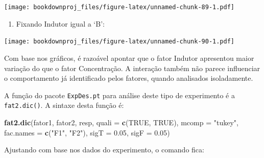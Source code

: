 \documentclass[
]{article}
\newenvironment{Shaded}{\begin{snugshade}}{\end{snugshade}}
\newcommand{\DataTypeTok}[1]{\textcolor[rgb]{0.13,0.29,0.53}{#1}}
\newcommand{\FloatTok}[1]{\textcolor[rgb]{0.00,0.00,0.81}{#1}}
\newcommand{\KeywordTok}[1]{\textcolor[rgb]{0.13,0.29,0.53}{\textbf{#1}}}
\newcommand{\NormalTok}[1]{#1}
\newcommand{\OperatorTok}[1]{\textcolor[rgb]{0.81,0.36,0.00}{\textbf{#1}}}
\newcommand{\OtherTok}[1]{\textcolor[rgb]{0.56,0.35,0.01}{#1}}
\newcommand{\StringTok}[1]{\textcolor[rgb]{0.31,0.60,0.02}{#1}}
\providecommand{\tightlist}{%
  \setlength{\itemsep}{0pt}\setlength{\parskip}{0pt}}
\begin{document}
\texttt{[image: bookdownproj\_files/figure-latex/unnamed-chunk-89-1.pdf]}

\begin{enumerate}
\def\labelenumi{\arabic{enumi}.}
\setcounter{enumi}{6}
\tightlist
\item
  Fixando Indutor igual a `B':
\end{enumerate}

\begin{Shaded}
\end{Shaded}

\texttt{[image: bookdownproj\_files/figure-latex/unnamed-chunk-90-1.pdf]}

Com base nos gráficos, é razoável apontar que o fator Indutor apresentou maior variação do que o fator Concentração. A interação também não parece influenciar o comportamento já identificado pelos fatores, quando analisados isoladamente.

A função do pacote \texttt{ExpDes.pt} para análise deste tipo de experimento é a \texttt{fat2.dic()}. A sintaxe desta função é:

\begin{Shaded}
\begin{Highlighting}[]
\KeywordTok{fat2.dic}\NormalTok{(fator1, fator2, resp, }\DataTypeTok{quali =} \KeywordTok{c}\NormalTok{(}\OtherTok{TRUE}\NormalTok{, }\OtherTok{TRUE}\NormalTok{), }
         \DataTypeTok{mcomp =} \StringTok{"tukey"}\NormalTok{, }\DataTypeTok{fac.names =} \KeywordTok{c}\NormalTok{(}\StringTok{"F1"}\NormalTok{, }\StringTok{"F2"}\NormalTok{), }
         \DataTypeTok{sigT =} \FloatTok{0.05}\NormalTok{, }\DataTypeTok{sigF =} \FloatTok{0.05}\NormalTok{)}
\end{Highlighting}
\end{Shaded}

Ajustando com base nos dados do experimento, o comando fica:

\begin{Shaded}
\end{Shaded}
\end{document}
